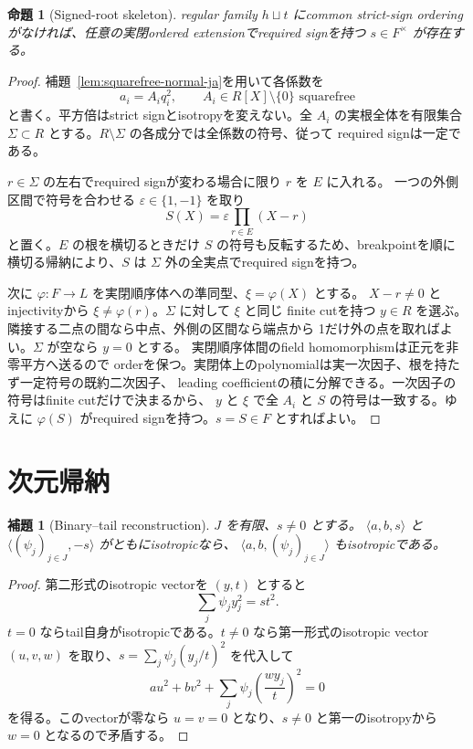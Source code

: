 \documentclass[uplatex,dvipdfmx]{jsarticle}
\newtheorem{proposition}[theorem]{命題}
\newtheorem{lemma}[theorem]{補題}
\theoremstyle{definition}
\theoremstyle{remark}
\begin{document}
\begin{proposition}[Signed-root skeleton]\label{prop:skeleton-ja}
regular family $h\sqcup t$ にcommon strict-sign orderingがなければ、任意の実閉ordered
extensionでrequired signを持つ $s\in F^\times$ が存在する。
\end{proposition}
\begin{proof}
補題~\ref{lem:squarefree-normal-ja}を用いて各係数を
\[
  a_i=A_iq_i^2,
  \qquad A_i\in R[X]\setminus\{0\}\text{ squarefree}
\]
と書く。平方倍はstrict signとisotropyを変えない。全 $A_i$ の実根全体を有限集合
$\Sigma\subset R$ とする。$R\setminus\Sigma$ の各成分では全係数の符号、従って
required signは一定である。

$r\in\Sigma$ の左右でrequired signが変わる場合に限り $r$ を $E$ に入れる。
一つの外側区間で符号を合わせる $\varepsilon\in\{1,-1\}$ を取り
\[
  S(X)=\varepsilon\prod_{r\in E}(X-r)
\]
と置く。$E$ の根を横切るときだけ $S$ の符号も反転するため、breakpointを順に
横切る帰納により、$S$ は $\Sigma$ 外の全実点でrequired signを持つ。

次に $\varphi:F\to L$ を実閉順序体への準同型、$\xi=\varphi(X)$ とする。
$X-r\ne0$ とinjectivityから $\xi\ne\varphi(r)$。$\Sigma$ に対して $\xi$ と同じ
finite cutを持つ $y\in R$ を選ぶ。隣接する二点の間なら中点、外側の区間なら端点から
1だけ外の点を取ればよい。$\Sigma$ が空なら $y=0$ とする。
実閉順序体間のfield homomorphismは正元を非零平方へ送るので
orderを保つ。実閉体上のpolynomialは実一次因子、根を持たず一定符号の既約二次因子、
leading coefficientの積に分解できる。一次因子の符号はfinite cutだけで決まるから、
$y$ と $\xi$ で全 $A_i$ と $S$ の符号は一致する。ゆえに $\varphi(S)$ がrequired
signを持つ。$s=S\in F$ とすればよい。
\end{proof}

\section{次元帰納}

\begin{lemma}[Binary--tail reconstruction]\label{lem:reconstruct-ja}
$J$ を有限、$s\ne0$ とする。
$\langle a,b,s\rangle$ と
$\langle(\psi_j)_{j\in J},-s\rangle$ がともにisotropicなら、
$\langle a,b,(\psi_j)_{j\in J}\rangle$ もisotropicである。
\end{lemma}
\begin{proof}
第二形式のisotropic vectorを $(y,t)$ とすると
\[
  \sum_j\psi_jy_j^2=s t^2.
\]
$t=0$ ならtail自身がisotropicである。$t\ne0$ なら第一形式のisotropic vector
$(u,v,w)$ を取り、$s=\sum_j\psi_j(y_j/t)^2$ を代入して
\[
  au^2+bv^2+\sum_j\psi_j\left(\frac{wy_j}{t}\right)^2=0
\]
を得る。このvectorが零なら $u=v=0$ となり、$s\ne0$ と第一のisotropyから
$w=0$ となるので矛盾する。
\end{proof}
\end{document}

